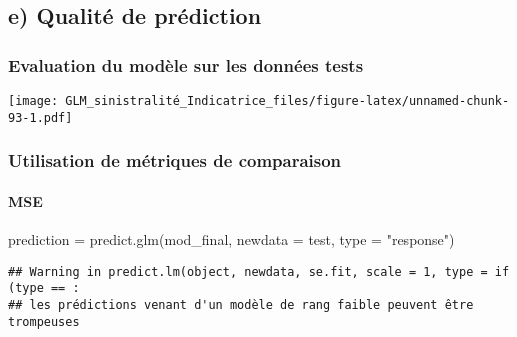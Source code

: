 \documentclass[
]{article}
\newenvironment{Shaded}{\begin{snugshade}}{\end{snugshade}}
\newcommand{\AttributeTok}[1]{\textcolor[rgb]{0.77,0.63,0.00}{#1}}
\newcommand{\FunctionTok}[1]{\textcolor[rgb]{0.00,0.00,0.00}{#1}}
\newcommand{\NormalTok}[1]{#1}
\newcommand{\OtherTok}[1]{\textcolor[rgb]{0.56,0.35,0.01}{#1}}
\newcommand{\SpecialCharTok}[1]{\textcolor[rgb]{0.00,0.00,0.00}{#1}}
\newcommand{\StringTok}[1]{\textcolor[rgb]{0.31,0.60,0.02}{#1}}
\begin{document}
\hypertarget{e-qualituxe9-de-pruxe9diction}{%
\subsection{e) Qualité de
prédiction}\label{e-qualituxe9-de-pruxe9diction}}

\hypertarget{evaluation-du-moduxe8le-sur-les-donnuxe9es-tests-1}{%
\subsubsection{Evaluation du modèle sur les données
tests}\label{evaluation-du-moduxe8le-sur-les-donnuxe9es-tests-1}}

\begin{Shaded}
\end{Shaded}

\texttt{[image: GLM\_sinistralité\_Indicatrice\_files/figure-latex/unnamed-chunk-93-1.pdf]}

\hypertarget{utilisation-de-muxe9triques-de-comparaison-1}{%
\subsubsection{Utilisation de métriques de
comparaison}\label{utilisation-de-muxe9triques-de-comparaison-1}}

\hypertarget{mse}{%
\paragraph{MSE}\label{mse}}

\begin{Shaded}
\begin{Highlighting}[]
\NormalTok{prediction }\OtherTok{=} \FunctionTok{predict.glm}\NormalTok{(mod\_final, }\AttributeTok{newdata =}\NormalTok{ test, }\AttributeTok{type =} \StringTok{"response"}\NormalTok{)}
\end{Highlighting}
\end{Shaded}

\begin{verbatim}
## Warning in predict.lm(object, newdata, se.fit, scale = 1, type = if (type == :
## les prédictions venant d'un modèle de rang faible peuvent être trompeuses
\end{verbatim}
\end{document}
